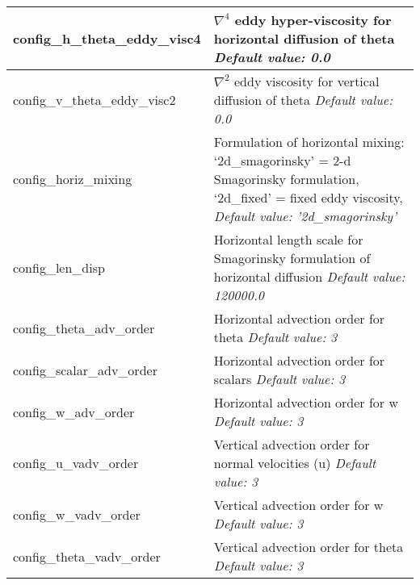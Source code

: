{\begin{longtable}{|p{1.75in} |p{4.5in}|}
   config\_h\_theta\_eddy\_visc4 & $\nabla^4$ eddy hyper-viscosity for horizontal diffusion of theta \newline 
   {\em Default value: 0.0} \\ \hline

   config\_v\_theta\_eddy\_visc2 & $\nabla^2$ eddy viscosity for vertical diffusion of theta \newline 
   {\em Default value: 0.0} \\ \hline

   config\_horiz\_mixing & Formulation of horizontal mixing: \newline
                                           `2d\_smagorinsky' = 2-d Smagorinsky formulation, \newline
                                           `2d\_fixed' = fixed eddy viscosity, \newline 
   {\em Default value: '2d\_smagorinsky'} \\ \hline

   config\_len\_disp & Horizontal length scale for Smagorinsky formulation of horizontal diffusion \newline 
   {\em Default value: 120000.0} \\ \hline

   config\_theta\_adv\_order & Horizontal advection order for theta \newline 
   {\em Default value: 3} \\ \hline

   config\_scalar\_adv\_order & Horizontal advection order for scalars \newline 
   {\em Default value: 3} \\ \hline

   config\_w\_adv\_order & Horizontal advection order for w \newline 
   {\em Default value: 3} \\ \hline

   config\_u\_vadv\_order & Vertical advection order for normal velocities (u) \newline 
   {\em Default value: 3} \\ \hline

   config\_w\_vadv\_order & Vertical advection order for w \newline 
   {\em Default value: 3} \\ \hline

   config\_theta\_vadv\_order & Vertical advection order for theta \newline 
   {\em Default value: 3} \\ \hline


\end{longtable}}
